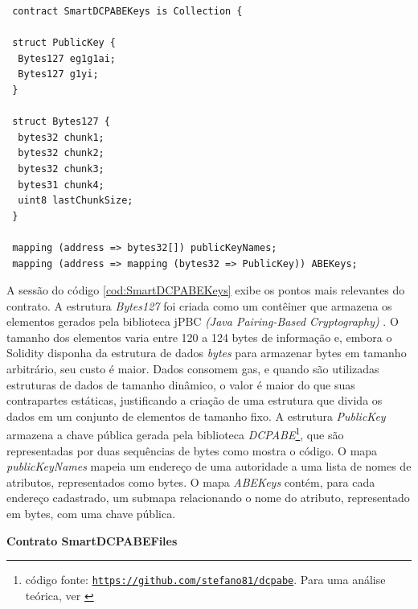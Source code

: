 \documentclass[a4paper,11pt]{article}
\begin{document}
\begin{lstlisting}
 contract SmartDCPABEKeys is Collection {

 struct PublicKey {
  Bytes127 eg1g1ai;
  Bytes127 g1yi;
 }

 struct Bytes127 {
  bytes32 chunk1;
  bytes32 chunk2;
  bytes32 chunk3;
  bytes31 chunk4;
  uint8 lastChunkSize;
 }

 mapping (address => bytes32[]) publicKeyNames;
 mapping (address => mapping (bytes32 => PublicKey)) ABEKeys;
\end{lstlisting}


A sessão do código \ref{cod:SmartDCPABEKeys} exibe os pontos mais relevantes do contrato.
A estrutura \emph{Bytes127} foi criada como um contêiner que armazena os elementos gerados pela biblioteca jPBC \emph{(Java Pairing-Based Cryptography)} \cite{DeCaro2011}. %
O tamanho dos elementos varia entre 120 a 124 bytes de informação e, embora o Solidity disponha da estrutura de dados \emph{bytes} para armazenar bytes em tamanho arbitrário, seu custo é maior.
Dados consomem gas, e quando são utilizadas estruturas de dados de tamanho dinâmico, o valor é maior do que suas contrapartes estáticas, justificando a criação de uma estrutura que divida os dados em um conjunto de elementos de tamanho fixo.
A estrutura \emph{PublicKey} armazena a chave pública gerada pela biblioteca \emph{DCPABE}\footnote{código fonte: \href{https://github.com/stefano81/dcpabe}{\texttt{https://github.com/stefano81/dcpabe}}. Para uma análise teórica, ver \cite{Lewko2011}}, que são representadas por duas sequências de bytes como mostra o código.
O mapa \emph{publicKeyNames} mapeia um endereço de uma autoridade a uma lista de nomes de atributos, representados como bytes.
O mapa \emph{ABEKeys} contém, para cada endereço cadastrado, um submapa relacionando o nome do atributo, representado em bytes, com uma chave pública.

\textbf{Contrato SmartDCPABEFiles}


\end{document}
